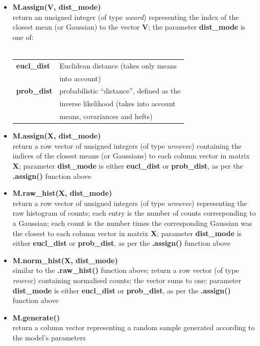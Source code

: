 \begin{itemize}
\item
{\bf M.assign(V, dist\_mode)}\\
return an unsigned integer (of type {\it uword}) representing the index of the
closest mean (or Gaussian) to the vector {\bf V}; the parameter {\bf dist\_mode} is one
of: \\
\ \\
\begin{tabular}{ll}
{\bf eucl\_dist} & Euclidean distance (takes only means \\
                 & into account) \\
{\bf prob\_dist} & probabilistic ``distance'', defined as the \\
                 & inverse likelihood (takes into account \\
                 & means, covariances and hefts) \\
\end{tabular}

\item
{\bf M.assign(X, dist\_mode)}\\
return a row vector of unsigned integers (of type {\it urowvec}) containing the indices of the closest means (or Gaussians) to each column vector in matrix {\bf X};
parameter {\bf dist\_mode} is either {\bf eucl\_dist} or {\bf prob\_dist}, as per the {\bf .assign()} function above

\item
{\bf M.raw\_hist(X, dist\_mode)}\\
return a row vector of unsigned integers (of type {\it urowvec}) representing the raw histogram of counts;
each entry is the number of counts corresponding to a Gaussian;
each count is the number times the corresponding Gaussian was the closest to each column vector in matrix {\bf X};
parameter {\bf dist\_mode} is either {\bf eucl\_dist} or {\bf prob\_dist}, as per the {\bf .assign()} function above

\item
{\bf M.norm\_hist(X, dist\_mode)}\\
similar to the {\bf .raw\_hist()} function above; return a row vector (of type {\it rowvec}) containing normalised counts; the vector sums to one;
parameter {\bf dist\_mode} is either {\bf eucl\_dist} or {\bf prob\_dist}, as per the {\bf .assign()} function above

\item
{\bf M.generate()}\\
return a column vector representing a random sample generated according to the model's parameters


\end{itemize}
